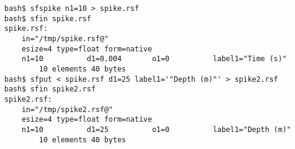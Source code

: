 \begin{verbatim}
bash$ sfspike n1=10 > spike.rsf
bash$ sfin spike.rsf
spike.rsf:
    in="/tmp/spike.rsf@"
    esize=4 type=float form=native
    n1=10          d1=0.004       o1=0          label1="Time (s)"
        10 elements 40 bytes
bash$ sfput < spike.rsf d1=25 label1='"Depth (m)"' > spike2.rsf
bash$ sfin spike2.rsf
spike2.rsf:
    in="/tmp/spike2.rsf@"
    esize=4 type=float form=native
    n1=10          d1=25          o1=0          label1="Depth (m)"
        10 elements 40 bytes
\end{verbatim}




